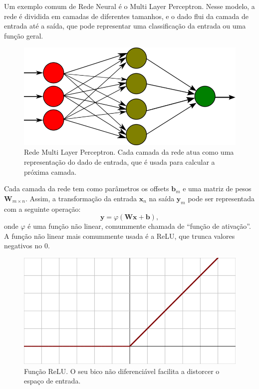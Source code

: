 Um exemplo comum de Rede Neural é o Multi Layer
Perceptron. Nesse modelo, a rede é dividida
em camadas de diferentes tamanhos, e o dado
flui da camada de entrada até a saída,
que pode representar uma classificação
da entrada ou uma função geral.


\begin{figure}[!ht]
	\centering
	\includegraphics[width=\linewidth*2/3]{files/assets/deeplearning/mlp.png}
	\caption{Rede Multi Layer Perceptron. Cada camada da
	rede atua como uma representação do dado de entrada, que
	é usada para calcular a próxima camada.}
	\label{img:preview}
\end{figure}


Cada camada da rede tem como parâmetros os offsets 
$\mathbf{b}_m$ e uma matriz de pesos $\mathbf{W}_{m\times n}$.
Assim, a transformação da entrada $\mathbf{x}_n$ na saída
$\mathbf{y}_m$ pode ser representada com a seguinte operação:
\begin{equation}
	\mathbf{y} = 
	\varphi\left( \mathbf{W}\mathbf{x} + \mathbf{b} \right),
\end{equation}
onde $\varphi$ é uma função não linear, comummente chamada
de ``função de ativação''. A função não linear
mais comummente usada é a ReLU, que trunca valores
negativos no $0$.

\begin{figure}[!ht]
	\centering
	\includegraphics[width=\linewidth*2/3]{files/assets/deeplearning/relu.png}
	\caption{Função ReLU. O seu bico não diferenciável
	facilita a distorcer o espaço de entrada.}
	\label{img:preview}
\end{figure}

